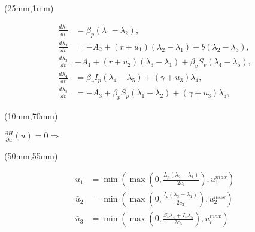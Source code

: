 \begin{frame}[plain]
	\begin{textblock*}{80mm}(25mm,1mm)
		\begin{greenbox}{}
			\begin{align*}
			\frac{d\lambda_1}{dt} &=\beta_p (\lambda_1-\lambda_2),\\
			\frac{d\lambda_2}{dt} &=-A_2+(r+u_1)(\lambda_2-\lambda_1)+b(\lambda_2-\lambda_3),\\
			\frac{d\lambda_3}{dt} &-A_1+(r+u_2)(\lambda_3-\lambda_1)+\beta_vS_v(\lambda_4-\lambda_5),\\
			\frac{d\lambda_4}{dt} &=\beta_v I_p(\lambda_4-\lambda_5)+(\gamma+u_3)\lambda_4,\\
			\frac{d\lambda_5}{dt} &=-A_3+\beta_p S_p(\lambda_1-\lambda_2)+(\gamma+u_3)\lambda_5,				
			\end{align*}
		\end{greenbox}	
	\end{textblock*}

	\begin{textblock*}{32mm}(10mm,70mm)
		\begin{yellowbox}{}
			$\frac{\partial H}{\partial u}(\bar{u})=0 \Rightarrow$
		\end{yellowbox}
	\end{textblock*}

	\begin{textblock*}{70mm}(50mm,55mm)
		\begin{yellowbox}{}
			\begin{align*}
				\bar{u}_1&=\min\left(\max\left(0,\frac{L_p(\lambda_2-\lambda_1)}{2c_1}\right),u_1^{max}\right)\\
				\bar{u}_2&=\min\left(\max\left(0,\frac{I_p(\lambda_3-\lambda_1)}{2c_2}\right),u_2^{max}\right)\\
				\bar{u}_3&=\min\left(\max\left(0,\frac{S_v\lambda_4+I_v\lambda_5}{2c_3}\right),u^{max}_i\right)
		\end{align*}
		\end{yellowbox}
		
	\end{textblock*}
	
\end{frame}
